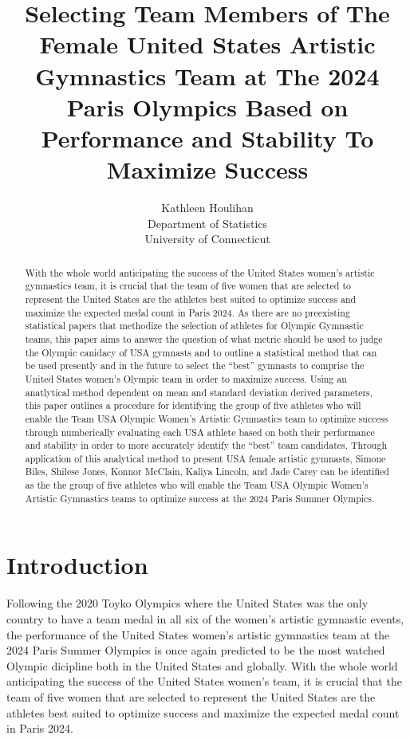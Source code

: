 \documentclass[12pt]{article}
\title{Selecting Team Members of The Female United States Artistic Gymnastics Team at The 2024 Paris Olympics 
Based on Performance and Stability To Maximize Success}
\author{Kathleen Houlihan\\
  Department of Statistics\\
  University of Connecticut
}
\begin{document}
\maketitle

\begin{abstract}
    
  With the whole world anticipating the success of the United States women's artistic gymnastics team, 
  it is crucial that the team of five women that are selected to represent the United States 
  are the athletes best suited to optimize success and maximize the expected medal count in Paris 2024. As there 
  are no preexisting statistical papers that methodize the selection of athletes for Olympic Gymnastic teams, 
  this paper aims to answer the question of what metric should be used to judge the Olympic canidacy of USA 
  gymnasts and to outline a statistical method that can be used presently and in the future to select the ``best'' 
  gymnasts to comprise the United States women's Olympic team in order to maximize success. Using an anatlytical 
  method dependent on mean and standard deviation derived parameters, this paper outlines a procedure for identifying 
  the group of five athletes who will enable the Team USA Olympic Women’s Artistic Gymnastics team to optimize 
  success through numberically evaluating each USA athlete based on both their performance and stability in order to 
  more accurately identify the ``best'' team candidates. Through application of this analytical method to present 
  USA female artistic gymnasts, Simone Biles, Shilese Jones, Konnor McClain, Kaliya Lincoln, and Jade Carey can be 
  identified as the the group of five athletes who will enable the Team USA Olympic Women’s Artistic Gymnastics 
  teams to optimize success at the 2024 Paris Summer Olympics.

\end{abstract}

\section{Introduction}
\label{sec:intro}

Following the 2020 Toyko Olympics where the United States was the only country to have a team medal 
in all six of the women's artistic gymnastic events, the performance of the United States women's artistic 
gymnastics team at the 2024 Paris Summer Olympics is once again predicted to be the most watched Olympic 
dicipline both in the United States and globally. With the whole world anticipating the success of the United 
States women's team, it is crucial that the team of five women that are selected to represent the United States 
are the athletes best suited to optimize success and maximize the expected medal count in Paris 2024.
\end{document}
